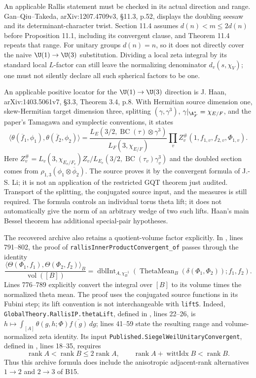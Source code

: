 \documentclass[11pt]{article}
\theoremstyle{definition}\newtheorem{definition}[theorem]{Definition}\newtheorem{remark}[theorem]{Remark}
\begin{document}
An applicable Rallis statement must be checked in its actual direction and range. Gan--Qiu--Takeda, arXiv:1207.4709v3, \S11.3, p.52, displays the doubling seesaw and its determinant-character twist. Section 11.4 assumes $d(n)<m\leq2d(n)$ before Proposition 11.1, including its convergent clause, and Theorem 11.4 repeats that range. For unitary groups $d(n)=n$, so it does not directly cover the naive $\U(1)\to\U(3)$ substitution. Dividing a local zeta integral by its standard local $L$-factor can still leave the normalizing denominator $d_v(s,\chi_V)$; one must not silently declare all such spherical factors to be one.

An applicable positive locator for the $\U(1)\to\U(3)$ direction is J. Haan, arXiv:1403.5061v7, \S3.3, Theorem 3.4, p.8. With Hermitian source dimension one, skew-Hermitian target dimension three, splitting $(\gamma,\gamma^3)$, $\gamma|_{\A_F^*}=\chi_{E/F}$, and the paper's Tamagawa and symplectic conventions, it states
\[
 \langle\theta(\overline f_1,\phi_1),\theta(\overline f_2,\phi_2)\rangle
 =\frac{L_E(3/2,\operatorname{BC}(\tau)\otimes\gamma^3)}
        {L_F(3,\chi_{E/F})}
   \prod_v Z_v^{\#}(1,f_{1,v},f_{2,v},\Phi_{1,v}).
\]
Here $Z_v^{\#}=L_v(3,\chi_{E_v/F_v})Z_v/L_{E_v}(3/2,\operatorname{BC}(\tau_v)\gamma_v^3)$ and the doubled section comes from $\rho_{1,3}(\phi_1\otimes\overline\phi_2)$. The source proves it by the convergent formula of J.-S. Li; it is not an application of the restricted GQT theorem just audited. Transport of the splitting, the conjugated source input, and the measures is still required. The formula controls an individual torus theta lift; it does not automatically give the norm of an arbitrary wedge of two such lifts. Haan's main Bessel theorem has additional special-pair hypotheses.

The recovered archive also retains a quotient-volume factor explicitly. In
, lines 791--802, the proof of \nolinkurl{rallisInnerProductConvergent_of} passes through the identity
\[
 \frac{\langle\Theta(\Phi_1,f_1),\Theta(\Phi_2,f_2)\rangle_B}
      {\operatorname{vol}([B])}
 =\operatorname{dblInt}_{A,\chi_B^{-1}}
       (\operatorname{ThetaMean}_B(\delta(\Phi_1,\Phi_2));f_1,f_2).
\]
Lines 776--789 explicitly convert the integral over $[B]$ to its volume times the normalized theta mean. The proof uses the conjugated source functions in its Fubini step; its lift convention is not interchangeable with \texttt{liftS}. Indeed, \nolinkurl{GlobalTheory.RallisIP.thetaLift}, defined in , lines 22--26, is $h\mapsto\int_{[A]}\theta(g,h;\Phi)\overline{f(g)}\,dg$; lines 41--59 state the resulting range and volume-normalized zeta identity. Its input \nolinkurl{Published.SiegelWeilUnitaryConvergent}, defined in , lines 18--35, requires
\[
 \operatorname{rank}A<\operatorname{rank}B\leq2\operatorname{rank}A,
 \qquad \operatorname{rank}A+\operatorname{wittIdx}B<\operatorname{rank}B.
\]
Thus this archive formula does include the anisotropic adjacent-rank alternatives $1\to2$ and $2\to3$ of B15.
\end{document}
